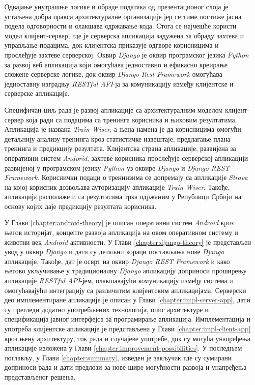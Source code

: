 \documentclass[12pt,oneside]{memoir}
\begin{document}
Одвајање унутрашње логике и обраде података од презентационог слоја је устаљена добра пракса архитектуралне организације јер се тиме постиже јасна подела одговорности и олакшава одржавање кода. Стога се најчешће користи модел клијент-сервер, где је серверска апликација задужена за обраду захтева и управљање подацима, док клијентска приказује одгворе корисницима и прослеђује захтеве серверској. Оквир \textit{Django} је оквир програмског језика \textit{Python} за развој веб апликација који омогућава једноставно и ефикасно креирање сложене серверске логике, док оквир \textit{Django Rest Framework} омогућава једноставну изградњу \textit{RESTful API}-ја за комуникацију између клијентске и серверске апликације.

Специфичан циљ рада је развој апликације са архитектуралним моделом клијент-сервер која ради са подацима са тренинга корисника и њиховим резултатима. Апликација је названа \textit{Train Wiser}, а њена намена је да корисницима омогући детаљнију анализу тренинга кроз статистичке извештаје, предлагање плана тренинга и предикцију резултата. Клијентска страна апликације, развијена за оперативни систем \textit{Andorid}, захтеве корисника прослеђује серверској апликацији развијеној у програмском језику \textit{Python} уз оквире \textit{Django} и \textit{Django REST Framework}. Кориснички подаци о тренинзима се допремају са апликације \textit{Strava} на којој корисник дозвољава ауторизацију апликације \textit{Train Wiser}. Такође, апликација располаже и са резултатима трка одржаним у Републици Србији на основу којих даје предикцију резултата корисника.

У Глави \ref{chapter:android-theory} је описан оперативни систем \textit{Android} кроз његов историјат, концепте развоја апликација на овом оперативном систему и животни век \textit{Android} активности. У Глави \ref{chapter:django-theory} је представљен увод у оквир \textit{Django} и дати су детаљни кораци постављања нове \textit{Django} апликације. Такође, дат је осврт на оквир \textit{Django REST Framework} и како његово укључивање у традиционалну \textit{Django} апликацију доприноси проширењу апликације \textit{RESTful API}-јем, олакшавајући комуникацију између система и омогућавајући интеграцију са различитим клијентским апликацијама. Серверски део имплементиране апликације је описан у Глави \ref{chapter:impl-server-app}, дати су прегледи додатно употребљених технологија, опис архитектуре и спецификација јавног интерфејса за програмирање апликација. Имплементација и употреба клијентске апликације је представљена у Глави \ref{chapter:impl-client-app} кроз њену архитектуру, ток рада и случајеве употребе, док су могућа унапређења апликације изложена у Глави \ref{chapter:improvement-possibilities}. У последњем поглављу, у Глави \ref{chapter:summary}, изведен је закључак где су сумирани доприноси рада и дати предлози за нове шире могућности развоја и унапређења представљеног решења.
\end{document}

